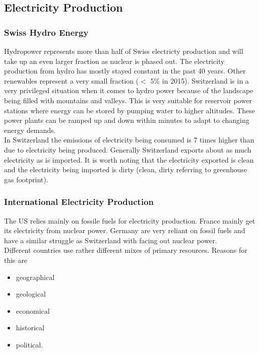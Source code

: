 \subsection{Electricity Production}

\subsubsection{Swiss Hydro Energy}
Hydropower represents more than half of Swiss electricty production and will take up an even larger fraction as nuclear is phased out.
The electricity production from hydro has mostly stayed constant in the past 40 years.
Other renewables represent a very small fraction ($<$ 5\% in 2015).
Switzerland is in a very privileged situation when it comes to hydro power because of the landscape being filled with mountains and valleys.
This is very suitable for reservoir power stations where energy can be stored by pumping water to higher altitudes.
These power plants can be ramped up and down within minutes to adapt to changing energy demands.\\

In Switzerland the \cotwo emissions of electricity being consumed is 7 times higher than due to electricity being produced.
Generally Switzerland exports about as much electricity as is imported. It is worth noting that the electricity exported is clean and the electricity being imported is dirty (clean, dirty referring to greenhouse gas footprint).

\subsubsection{International Electricity Production}
The US relies mainly on fossile fuels for electricity production.
France mainly get its electricity from nuclear power.
Germany are very reliant on fossil fuels and have a similar struggle as Switzerland with facing out nuclear power.\\

Different countries use rather different mixes of primary resources.
Reasons for this are

\begin{itemize}
    \item geographical
    \item geological
    \item economical
    \item historical
    \item political.
\end{itemize}


